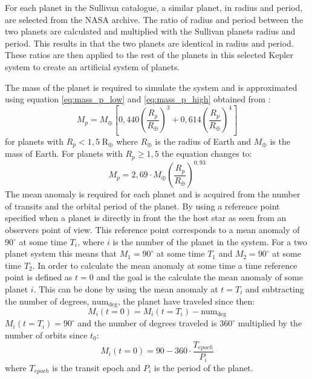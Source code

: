 \documentclass[12pt]{report}
\begin{document}
	For each planet in the Sullivan catalogue, a similar planet, in radius and period, are selected from the NASA archive. The ratio of radius and period between the two planets are calculated and multiplied with the Sullivan planets radius and period. This results in that the two planets are identical in radius and period. These ratios are then applied to the rest of the planets in this selected Kepler system to create an artificial system of planets.  
	
	The mass of the planet is required to simulate the system and is approximated using equation \ref{eq:mass_p_low} and \ref{eq:mass_p_high} obtained from \cite{2015ApJ...809...77S}:
	\begin{equation}
	\label{eq:mass_p_low}
	M_p = M_{\oplus} \left[0,440 \left(\frac{R_p}{R_{\oplus}}\right)^3 + 0,614\left(\frac{R_p}{R_{\oplus}}\right)^4\right]
	\end{equation}
	for planets with $R_p < 1,5 \; \mathrm{R_{\oplus}}$ where $R_{\oplus}$ is the radius of Earth and $M_{\oplus}$ is the mass of Earth. For planets with $R_p \geq 1,5$ the equation changes to:
	\begin{equation}
	\label{eq:mass_p_high}
	M_p = 2,69\cdot M_{\oplus}\left(\frac{R_p}{R_{\oplus}}\right)^{0,93}
	\end{equation}
	The mean anomaly is required for each planet and is acquired from the number of transits and the orbital period of the planet. By using a reference point specified when a planet is directly in front the the host star as seen from an observers point of view. This reference point corresponds to a mean anomaly of 90$^{\circ}$ at some time $T_i$, where $i$ is the number of the planet in the system. For a two planet system this means that $M_1=90^{\circ}$ at some time $T_1$ and $M_2=90^{\circ}$ at some time $T_2$. In order to calculate the mean anomaly at some time a time reference point is defined as $t=0$ and the goal is the calculate the mean anomaly of some planet $i$. This can be done by using the mean anomaly at $t = T_i$ and subtracting the number of degrees, $\mathrm{num_{deg}}$, the planet have traveled since then:
\begin{equation}
	M_i(t=0) = M_i(t=T_i) - \mathrm{num_{deg}}
\end{equation}
	$M_i(t=T_i) = 90^{\circ}$ and the number of degrees traveled is $360^{\circ}$ multiplied by the number of orbits since $t_0$:
\begin{equation}
	M_i(t=0) = 90 - 360\cdot \frac{T_{epoch}}{P_i}
\end{equation}
	where $T_{epoch}$ is the transit epoch and $P_i$ is the period of the planet.
	
\end{document}
